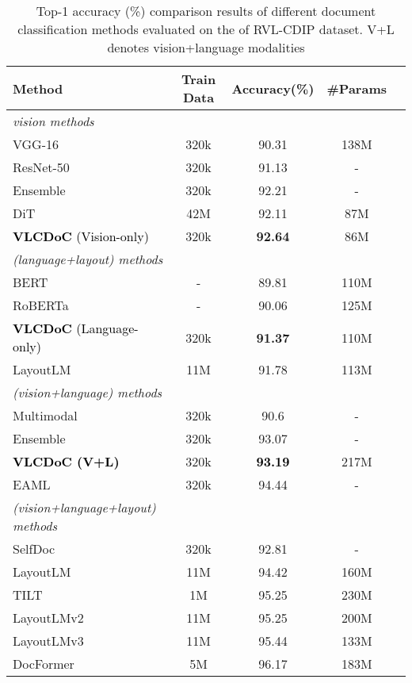 \documentclass[preprint,review,12pt]{elsarticle}
\begin{document}
\begin{table}[t]
\footnotesize
\centering
\caption{Top-1 accuracy (\%) comparison results of different document classification methods evaluated on the of RVL-CDIP dataset. V+L denotes vision+language modalities}
{\begin{tabular}{@{}lcccc@{}}
\toprule
Method  &  Train Data & Accuracy(\%) & \#Params\\
\midrule
\textit{vision methods} \\
\midrule
VGG-16~\cite{afzal2017cutting}     & 320k & 90.31 & 138M \\
ResNet-50~\cite{afzal2017cutting} & 320k & 91.13 & -\\
Ensemble~\cite{das2018document}        & 320k & 92.21 & -\\
DiT~\cite{li2022dit} & 42M & 92.11 & 87M \\
\textcolor{black}{\textbf{VLCDoC} (Vision-only)}  & 320k & \textbf{92.64} & 86M \\
\midrule
\textit{(language+layout) methods}\\
\midrule
BERT~\cite{devlin2019bert}     & - & 89.81 & 110M \\
RoBERTa~\cite{liu2019roberta}  & - & 90.06 & 125M \\
\textcolor{black}{\textbf{VLCDoC} (Language-only)} & 320k & \textbf{91.37}   & 110M \\
LayoutLM~\cite{LayoutLMv1}     & 11M & 91.78 & 113M \\
\midrule
\textit{(vision+language) methods} \\
\midrule
Multimodal~\cite{audebert2019multimodal} & 320k & 90.6 & -\\
Ensemble~\cite{dauphinee2019modular} & 320k & 93.07 & -\\
\textcolor{black}{\textbf{VLCDoC (V+L)}} & 320k & \textcolor{black}{\textbf{93.19}}   & 217M \\
EAML~\cite{bakkali2021eaml} & 320k & 94.44 & -\\
\midrule
\textit{(vision+language+layout) methods} \\
\midrule
SelfDoc ~\cite{li2021selfdoc} & 320k & 92.81 &  -\\
LayoutLM~\cite{LayoutLMv1} &  11M & 94.42 & 160M \\
TILT~\cite{powalski2021going} & 1M & 95.25 & 230M \\
LayoutLMv2~\cite{xu2022layoutlmv2} & 11M & 95.25 & 200M \\
LayoutLMv3~\cite{huang2022layoutlmv3} &  11M & 95.44 & 133M \\
DocFormer~\cite{appalaraju2021docformer} & 5M & 96.17 & 183M \\
\bottomrule
\end{tabular}}
\label{tab:SOTAComparison}
\end{table}
\end{document}
